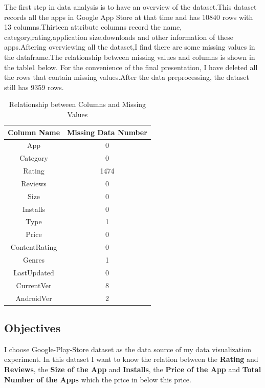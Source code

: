 \documentclass{hci}
\begin{document}
The first step in data analysis is to have an overview of the dataset.This dataset records all the apps in Google App Store at that time and has 10840 rows with 13 columns.Thirteen attribute columns record the name, category,rating,application size,downloads and other information of these apps.Aftering overviewing all the dataset,I find there are some  missing values in the dataframe.The relationship between missing values and columns is shown in the table1 below. For the convenience of the final presentation, I have deleted all the rows that contain missing values.After the data preprocessing, the dataset still has 9359 rows.
\begin{table}[htbp] %
	\caption{Relationship between Columns and Missing Values} %
	\centering
	\label{t1}
	\begin{tabular}{c|c} %
		\hline
		\hline
		Column Name& Missing Data Number                                                                                                                                         \\

		\hline App&0\\
		\hline	Category &0\\
		\hline	Rating   &1474\\
		\hline	Reviews &0\\
		\hline	Size &0\\
		\hline	Installs &0\\
		\hline	Type &1\\
		\hline	Price &0\\
		\hline	ContentRating &0\\
		\hline	Genres &1\\
		\hline	LastUpdated&0\\
		\hline	CurrentVer &8\\
		\hline	AndroidVer &2\\		
		\hline
	\end{tabular}
\end{table}

\subsection{Objectives}
I choose Google-Play-Store dataset as the data source of my data visualization experiment.
In this dataset I want to know the relation between the \textbf{Rating} and \textbf{Reviews}, the\textbf{ Size of the App} and \textbf{Installs}, the \textbf{Price of the App} and \textbf{Total Number of the Apps} which the price in below this price.
\end{document}
